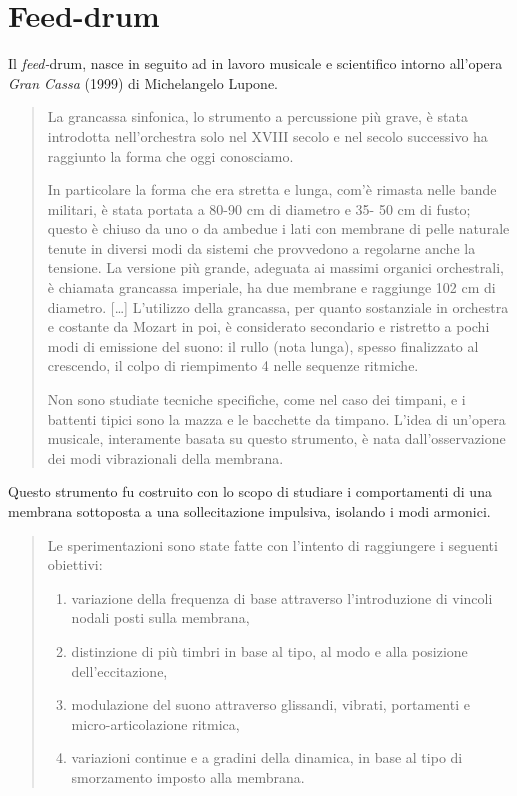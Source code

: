 \section{Feed-drum}

Il \emph{feed-}drum, nasce in seguito ad in lavoro musicale e scientifico
intorno all’opera \emph{Gran Cassa} (1999) di Michelangelo Lupone.

\begin{quote}
La grancassa sinfonica, lo strumento a percussione più grave, è stata introdotta
nell’orchestra solo nel XVIII secolo e nel secolo successivo ha raggiunto la
forma che oggi conosciamo.

In particolare la forma che era stretta e lunga, com’è rimasta nelle bande
militari, è stata portata a 80-90 cm di diametro e 35- 50 cm di fusto; questo
è chiuso da uno o da ambedue i lati con membrane di pelle naturale tenute in
diversi modi da sistemi che provvedono a regolarne anche la tensione.
La versione più grande, adeguata ai massimi organici orchestrali, è chiamata
grancassa imperiale, ha due membrane e raggiunge 102 cm di diametro. [\ldots]
L’utilizzo della grancassa, per quanto sostanziale in orchestra e costante da
Mozart in poi, è considerato secondario e ristretto a pochi modi di emissione
del suono: il rullo (nota lunga), spesso finalizzato al crescendo, il colpo di
riempimento 4 nelle sequenze ritmiche.

Non sono studiate tecniche specifiche, come nel caso dei timpani, e i battenti
tipici sono la mazza e le bacchette da timpano. L’idea di un’opera musicale,
interamente basata su questo strumento, è nata dall’osservazione dei modi
vibrazionali della membrana. \cite{ml:fd}
\end{quote}

Questo strumento fu costruito con lo scopo di studiare i comportamenti di una
membrana sottoposta a una sollecitazione impulsiva, isolando i modi armonici.

\begin{quote}
Le sperimentazioni sono state fatte con l’intento di raggiungere i seguenti
obiettivi:

\begin{enumerate}
  \item variazione della frequenza di base attraverso l’introduzione di vincoli
nodali posti sulla membrana,
  \item distinzione di più timbri in base al tipo, al modo e alla posizione
dell’eccitazione,
  \item modulazione del suono attraverso glissandi, vibrati, portamenti e
micro-articolazione ritmica,
  \item variazioni continue e a gradini della dinamica, in base al tipo di
  smorzamento imposto alla membrana. \cite{ml:fd}
\end{enumerate}
\end{quote}

